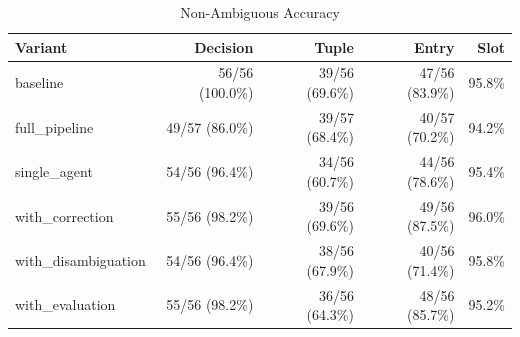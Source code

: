 \begin{table}[htbp]
\centering
\caption{Non-Ambiguous Accuracy}
\label{tab:acc-non-ambig}
\begin{tabular}{l rrrr}
\toprule
Variant & Decision & Tuple & Entry & Slot \\
\midrule
  baseline & 56/56 (100.0\%) & 39/56 (69.6\%) & 47/56 (83.9\%) & 95.8\% \\
  full\_pipeline & 49/57 (86.0\%) & 39/57 (68.4\%) & 40/57 (70.2\%) & 94.2\% \\
  single\_agent & 54/56 (96.4\%) & 34/56 (60.7\%) & 44/56 (78.6\%) & 95.4\% \\
  with\_correction & 55/56 (98.2\%) & 39/56 (69.6\%) & 49/56 (87.5\%) & 96.0\% \\
  with\_disambiguation & 54/56 (96.4\%) & 38/56 (67.9\%) & 40/56 (71.4\%) & 95.8\% \\
  with\_evaluation & 55/56 (98.2\%) & 36/56 (64.3\%) & 48/56 (85.7\%) & 95.2\% \\
\bottomrule
\end{tabular}
\end{table}
